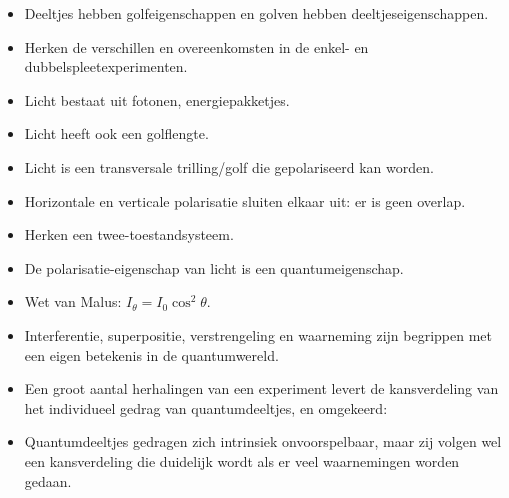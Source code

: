 \documentclass[../../main.tex]{subfiles}
\begin{document}
\begin{itemize}
\item Deeltjes hebben golfeigenschappen en golven hebben deeltjeseigenschappen.  
\item Herken de verschillen en overeenkomsten in de enkel- en dubbelspleetexperimenten.
\item Licht bestaat uit fotonen, energiepakketjes. 
\item Licht heeft ook een golflengte.
\item Licht is een transversale trilling/golf die gepolariseerd kan worden.
\item Horizontale en verticale polarisatie sluiten elkaar uit: er is geen overlap.
\item Herken een twee-toestandsysteem.
\item De polarisatie-eigenschap van licht is een quantumeigenschap.
\item Wet van Malus: $I_\theta=I_0 \cos^2\theta$.
\item Interferentie, superpositie, verstrengeling en waarneming zijn begrippen met een eigen betekenis in de quantumwereld.
\item Een groot aantal herhalingen van een experiment levert de kansverdeling van het individueel gedrag van quantumdeeltjes, en omgekeerd:
\item Quantumdeeltjes gedragen zich intrinsiek onvoorspelbaar, maar zij volgen wel een kansverdeling die duidelijk wordt als er veel waarnemingen worden gedaan.
\end{itemize}

\end{document}
